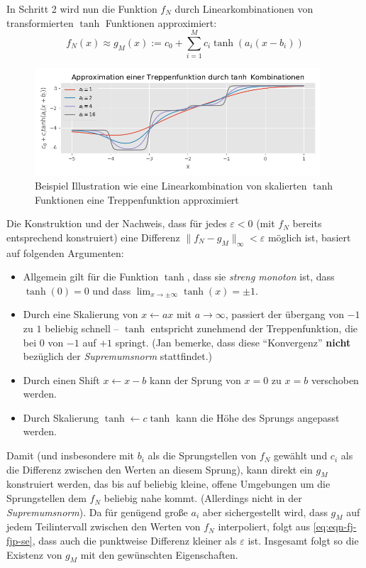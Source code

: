 \documentclass[
]{book}
\theoremstyle{definition}
\theoremstyle{definition}
\theoremstyle{definition}
\theoremstyle{definition}
\theoremstyle{remark}
\begin{document}
In Schritt 2 wird nun die Funktion \(f_N\) durch Linearkombinationen von
transformierten \(\tanh\) Funktionen approximiert:
\begin{equation*}
f_N(x) \approx g_M(x) := c_0 + \sum_{i=1}^Mc_i\tanh(a_i(x-b_i))
\end{equation*}

\begin{figure}
\hypertarget{fig:sum-tanhs}{%
\centering
\includegraphics[width=0.95\textwidth,height=\textheight]{bilder/09-sumtanhs.png}
\caption{Beispiel Illustration wie eine Linearkombination von skalierten \(\tanh\) Funktionen eine Treppenfunktion approximiert}\label{fig:sum-tanhs}
}
\end{figure}

Die Konstruktion und der Nachweis, dass für jedes \(\varepsilon<0\) (mit \(f_N\) bereits entsprechend konstruiert) eine Differenz \(\|f_N - g_M\|_\infty < \varepsilon\) möglich ist, basiert auf folgenden Argumenten:

\begin{itemize}
\item
  Allgemein gilt für die Funktion \(\tanh\), dass sie \emph{streng monoton} ist,
  dass \(\tanh(0)=0\) und dass \(\lim_{x\to \pm \infty} \tanh(x) = \pm 1\).
\item
  Durch eine Skalierung von \(x\leftarrow ax\) mit \(a\to \infty\), passiert der übergang von \(-1\) zu \(1\)
  beliebig schnell -- \(\tanh\) entspricht zunehmend der Treppenfunktion, die
  bei \(0\) von \(-1\) auf \(+1\) springt. (Jan bemerke, dass diese ``Konvergenz''
  \textbf{nicht} bezüglich der \emph{Supremumsnorm} stattfindet.)
\item
  Durch einen Shift \(x \leftarrow x-b\) kann der Sprung von \(x=0\) zu \(x=b\)
  verschoben werden.
\item
  Durch Skalierung \(\tanh \leftarrow c\tanh\) kann die Höhe des Sprungs
  angepasst werden.
\end{itemize}

Damit (und insbesondere mit \(b_i\) als die Sprungstellen von \(f_N\) gewählt
und \(c_i\) als die Differenz zwischen den Werten an diesem Sprung), kann direkt
ein \(g_M\) konstruiert werden, das bis auf beliebig kleine, offene Umgebungen um die
Sprungstellen dem \(f_N\) beliebig nahe kommt. (Allerdings nicht in der
\emph{Supremumsnorm}).
Da für genügend große \(a_i\) aber sichergestellt wird, dass \(g_M\)
auf jedem Teilintervall zwischen den Werten von \(f_N\) interpoliert, folgt aus
\eqref{eq:eqn-fj-fjp-se},
dass auch die punktweise Differenz kleiner als \(\varepsilon\)
ist.
Insgesamt folgt so die Existenz von \(g_M\) mit den gewünschten
Eigenschaften.
\end{document}
